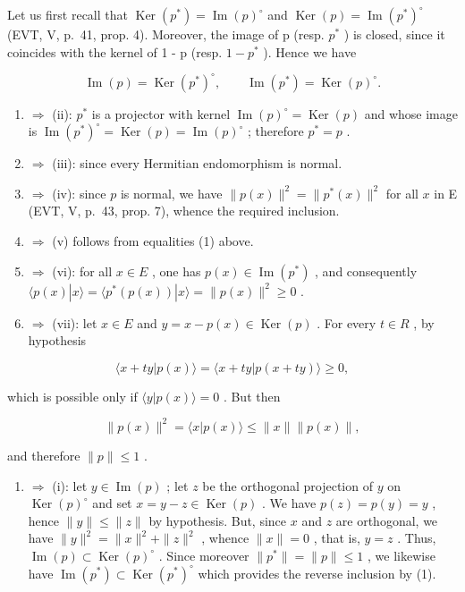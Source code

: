 Let us first recall that \(\operatorname{Ker}(p^{*}) = \operatorname{Im}(p)^{\circ}\) and \(\operatorname{Ker}(p) = \operatorname{Im}(p^{*})^{\circ}\) (EVT, V, p.~41, prop. 4). Moreover, the image of p (resp. \(p^{*}\) ) is closed, since it coincides with the kernel of 1 - p (resp. \(1 - p^{*}\) ). Hence we have

\[
\operatorname{Im} (p) = \operatorname{Ker} (p ^ {*}) ^ {\circ}, \qquad \operatorname{Im} (p ^ {*}) = \operatorname{Ker} (p) ^ {\circ}.\tag{1}
\]

\begin{enumerate}
\def\labelenumi{(\roman{enumi})}
\item
  \(\Longrightarrow\) (ii): \(p^{*}\) is a projector with kernel \(\operatorname{Im}(p)^{\circ} = \operatorname{Ker}(p)\) and whose image is \(\operatorname{Im}(p^{*})^{\circ} = \operatorname{Ker}(p) = \operatorname{Im}(p)^{\circ}\) ; therefore \(p^{*} = p\) .
\item
  \(\Longrightarrow\) (iii): since every Hermitian endomorphism is normal.
\item
  \(\Longrightarrow\) (iv): since \(p\) is normal, we have \(\| p(x)\|^2 = \| p^*(x)\|^2\) for all \(x\) in E (EVT, V, p.~43, prop. 7), whence the required inclusion.
\item
  \(\Longrightarrow\) (v) follows from equalities (1) above.
\item
  \(\Longrightarrow\) (vi): for all \(x \in E\) , one has \(p(x) \in \operatorname{Im}(p^{*})\) , and consequently \(\langle p(x)|x\rangle = \langle p^{*}(p(x))|x\rangle = \|p(x)\|^{2} \geqslant 0\) .
\item
  \(\Longrightarrow\) (vii): let \(x \in E\) and \(y = x - p(x) \in \operatorname{Ker}(p)\) . For every \(t \in R\) , by hypothesis
\end{enumerate}

\[
\langle x + t y | p (x) \rangle = \langle x + t y | p (x + t y) \rangle \geqslant 0,
\]

which is possible only if \(\langle y|p(x)\rangle = 0\) . But then

\[
\| p (x) \| ^ {2} = \langle x | p (x) \rangle \leqslant \| x \| \| p (x) \|,
\]

and therefore \(\|p\|\leqslant1\) .

\begin{enumerate}
\def\labelenumi{(\roman{enumi})}
\setcounter{enumi}{6}
\tightlist
\item
  \(\Longrightarrow\) (i): let \(y \in \operatorname{Im}(p)\) ; let \(z\) be the orthogonal projection of \(y\) on \(\operatorname{Ker}(p)^{\circ}\) and set \(x = y - z \in \operatorname{Ker}(p)\) . We have \(p(z) = p(y) = y\) , hence \(\|y\| \leqslant \|z\|\) by hypothesis. But, since \(x\) and \(z\) are orthogonal, we have \(\|y\|^2 = \|x\|^2 + \|z\|^2\) , whence \(\|x\| = 0\) , that is, \(y = z\) . Thus, \(\operatorname{Im}(p) \subset \operatorname{Ker}(p)^{\circ}\) . Since moreover \(\|p^*\| = \|p\| \leqslant 1\) , we likewise have \(\operatorname{Im}(p^*) \subset \operatorname{Ker}(p^*)^{\circ}\) which provides the reverse inclusion by (1).
\end{enumerate}

